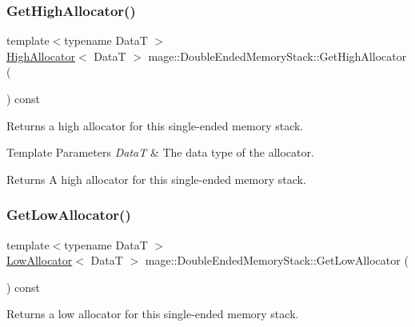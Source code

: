 \subsubsection{\texorpdfstring{Get\+High\+Allocator()}{GetHighAllocator()}}
{\footnotesize\ttfamily template$<$typename DataT $>$ \\
\mbox{\hyperlink{classmage_1_1_double_ended_memory_stack_1_1_high_allocator}{High\+Allocator}}$<$ DataT $>$ mage\+::\+Double\+Ended\+Memory\+Stack\+::\+Get\+High\+Allocator (\begin{DoxyParamCaption}{ }\end{DoxyParamCaption}) const\hspace{0.3cm}{\ttfamily [noexcept]}}

Returns a high allocator for this single-\/ended memory stack.


\begin{DoxyTemplParams}{Template Parameters}
{\em DataT} & The data type of the allocator. \\
\hline
\end{DoxyTemplParams}
\begin{DoxyReturn}{Returns}
A high allocator for this single-\/ended memory stack. 
\end{DoxyReturn}
\mbox{\label{classmage_1_1_double_ended_memory_stack_a9ca15b7e92e19744db2b3c9862062006}} 
\subsubsection{\texorpdfstring{Get\+Low\+Allocator()}{GetLowAllocator()}}
{\footnotesize\ttfamily template$<$typename DataT $>$ \\
\mbox{\hyperlink{classmage_1_1_double_ended_memory_stack_1_1_low_allocator}{Low\+Allocator}}$<$ DataT $>$ mage\+::\+Double\+Ended\+Memory\+Stack\+::\+Get\+Low\+Allocator (\begin{DoxyParamCaption}{ }\end{DoxyParamCaption}) const\hspace{0.3cm}{\ttfamily [noexcept]}}

Returns a low allocator for this single-\/ended memory stack.


